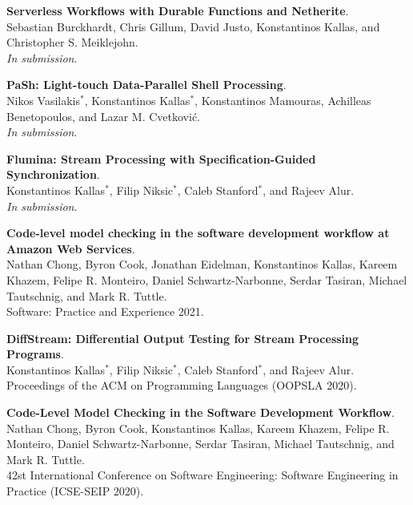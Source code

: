 \begin{minipage}{\textwidth}
\textbf{Serverless Workflows with Durable Functions and Netherite}. \\
Sebastian Burckhardt, Chris Gillum, David Justo, Konstantinos Kallas, and Christopher S. Meiklejohn. \\
\emph{In submission}.
\end{minipage}

\begin{minipage}{\textwidth}
\textbf{PaSh: Light-touch Data-Parallel Shell Processing}. \\
Nikos Vasilakis$^*$, Konstantinos Kallas$^*$, Konstantinos Mamouras, Achilleas Benetopoulos, and Lazar M. Cvetković. \\
\emph{In submission}.
\end{minipage}

\begin{minipage}{\textwidth}
\textbf{Flumina: Stream Processing with Specification-Guided Synchronization}. \\
Konstantinos Kallas$^*$, Filip Niksic$^*$, Caleb Stanford$^*$, and Rajeev Alur. \\
\emph{In submission}.
\end{minipage}

\begin{minipage}{\textwidth}
\textbf{Code-level model checking in the software development workflow at Amazon Web Services}. \\
Nathan Chong, Byron Cook, Jonathan Eidelman, Konstantinos Kallas, Kareem Khazem, Felipe R. Monteiro, Daniel Schwartz-Narbonne, Serdar Tasiran, Michael Tautschnig, and Mark R. Tuttle. \\
Software: Practice and Experience 2021.
\end{minipage}

\begin{minipage}{\textwidth}
\textbf{DiffStream: Differential Output Testing for Stream Processing Programs}. \\
Konstantinos Kallas$^*$, Filip Niksic$^*$, Caleb Stanford$^*$, and Rajeev Alur. \\
Proceedings of the ACM on Programming Languages (OOPSLA 2020).
\end{minipage}

\begin{minipage}{\textwidth}
\textbf{Code-Level Model Checking in the Software Development Workflow}. \\
Nathan Chong, Byron Cook, Konstantinos Kallas, Kareem Khazem, Felipe R. Monteiro, Daniel Schwartz-Narbonne, Serdar Tasiran, Michael Tautschnig, and Mark R. Tuttle. \\
42st International Conference on Software Engineering: Software Engineering in Practice (ICSE-SEIP 2020).
\end{minipage}

